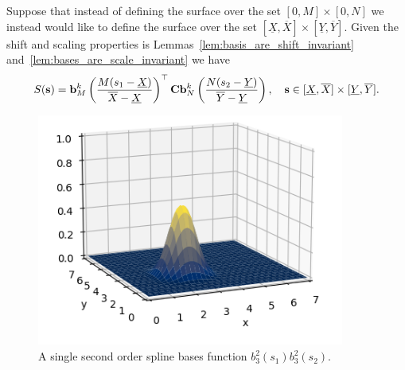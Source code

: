 Suppose that instead of defining the surface over the set $[0, M]\times[0, N]$ we instead would like to define the surface over the set $[\underline{X}, \overline{X}]\times[\underline{Y}, \overline{Y}]$.  Given the shift and scaling properties is Lemmas~\ref{lem:basis_are_shift_invariant} and~\ref{lem:bases_are_scale_invariant} we have 
\begin{equation}\label{eq:spline_surface3}
S(\sbf) = \bbf^k_M\left(\frac{M(s_1-\underline{X})}{\overline{X}-\underline{X}}\right)^\top \Cbf \bbf^k_N\left(\frac{N(s_2-\underline{Y})}{\overline{Y}-\underline{Y}}\right), \quad \sbf\in[\underline{X}, \overline{X}]\times[\underline{Y}, \overline{Y}].
\end{equation}

\begin{figure}[hbt]
  \centering\includegraphics[width=0.9\textwidth]{./chap5_trajectory_planning/figures/spline_surface_basis}
  \caption{A single second order spline bases function $b_3^2(s_1)b_3^2(s_2)$.}
  \label{fig:spline_surface_bases}  
\end{figure}


